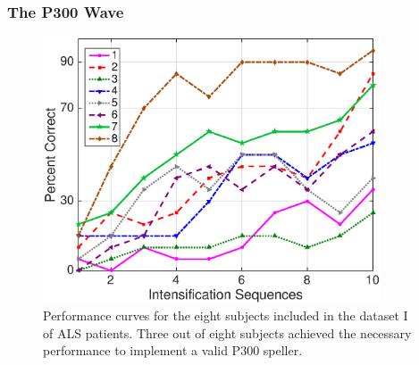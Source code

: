 \documentclass[aspectratio=169]{beamer}
\begin{document}
\begin{frame}
\frametitle{The P300 Wave}
\begin{center}
\begin{figure}[h!]
\centering
\includegraphics[width=10cm]{images/performance.eps}
\caption[Dataset I ALS Patients Dataset P300 Performance Curves]{Performance curves for the eight subjects included in the dataset I of ALS patients.  Three out of eight subjects achieved the necessary performance to implement a valid P300 speller.}
\label{fig:performance}
\end{figure}
\end{center}
\end{frame} 
\end{document}
